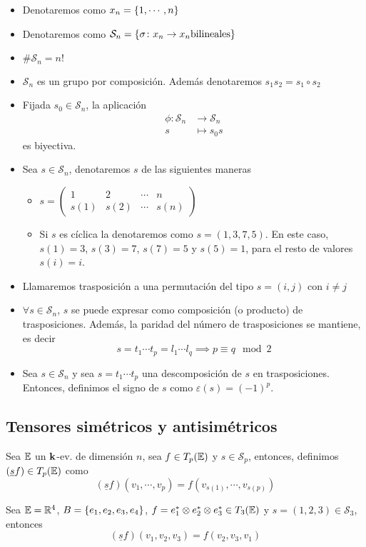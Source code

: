 \begin{itemize}
	\item Denotaremos como $x_n = \left\{1, \cdots, n\right\}$
	\item Denotaremos como $\mathcal{S}_n =\left\{\sigma\colon x_n \to
		x_n \text{bilineales}\right\}$
	\item $\#\mathcal{S}_n= n!$
	\item $\mathcal{S}_n$ es un grupo por composición. Además denotaremos
		$s_1 s_2 = s_1 \circ s_2$
	\item Fijada $s_0 \in \mathcal{S}_n$, la aplicación
		\[
			\begin{aligned}
				\phi \colon \mathcal{S}_n &\to \mathcal{S}_n \\
				s &\mapsto s_0s
			\end{aligned}
		\]
		es biyectiva.
	\item Sea $s \in \mathcal{S}_n$, denotaremos $s$  de las siguientes maneras
		\begin{itemize}
			\item $s = \begin{pmatrix}
				1 & 2 & \cdots & n \\
				s(1) & s(2) & \cdots & s(n)
			\end{pmatrix}$
			\item Si $s$ es cíclica la denotaremos como $s = (1,3,7,5)$. En este
			caso, $s(1)=3$, $s(3)=7$, $s(7)=5$ y $s(5)=1$, para el resto de valores
			$s(i)=i$.
		\end{itemize}
	\item Llamaremos trasposición a una permutación del tipo $s=(i,j)$ con
		$i \neq j$
	\item $\forall s \in \mathcal{S}_n$, $s$ se puede expresar como composición
		(o producto) de trasposiciones. Además, la paridad del número de
		trasposiciones se mantiene, es decir
		\[
			s = t_1 \cdots t_p = l_1 \cdots l_q \implies p \equiv q \mod 2
		\]
	\item Sea $s \in \mathcal{S}_n$ y sea $s=t_1 \cdots t_p$ una descomposición de
		$s$ en trasposiciones. Entonces, definimos el signo de $s$ como 
		$\varepsilon(s) = (-1)^p$.
\end{itemize}

\subsection{Tensores simétricos y antisimétricos}

\begin{defi}
	Sea $\mathbb{E}$ un $\mathbf{k}$-ev. de dimensión $n$, sea $f \in T_p(\mathbb{E})$ y $s \in\mathcal{S}_p$,
	entonces, definimos $(\underline{s}f) \in T_p(\mathbb{E})$ como
	\[
		(\underline{s}f)(v_1, \cdots, v_p) = f(v_{s(1)}, \cdots, v_{s(p)})
	\]
\end{defi}
\begin{example}
	Sea $\mathbb{E} = \mathbb{R}^4$, $B = \left\{e_1, e_2, e_3, e_4\right\}$, $f = e_1^* \otimes e_2^*
	\otimes e_3^* \in T_3(\mathbb{E})$ y $s = (1,2,3) \in \mathcal{S}_3$, entonces
	\[
		(\underline{s}f)(v_1,v_2,v_3) = f(v_2,v_3,v_1)
	\]
\end{example}

